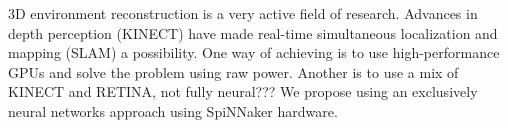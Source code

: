 3D environment reconstruction is a very active field of research.
Advances in depth perception (KINECT) have made real-time simultaneous localization and mapping (SLAM) a possibility.
One way of achieving is to use high-performance GPUs and solve the problem using raw power.
Another is to use a mix of KINECT and RETINA, not fully neural???
We propose using an exclusively neural networks approach using SpiNNaker hardware.